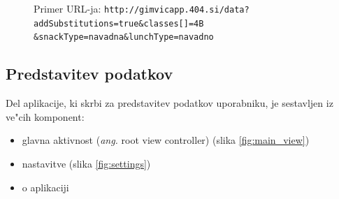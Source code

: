 \begin{figure}[!h]
	\centering
	Primer URL-ja:
	\texttt{http://gimvicapp.404.si/data?addSubstitutions=true\&classes[]=4B\\\&snackType=navadna\&lunchType=navadno}
\end{figure}

\subsection{Predstavitev podatkov}
Del aplikacije, ki skrbi za predstavitev podatkov uporabniku, je sestavljen iz ve"cih komponent:
\begin{itemize}
	\setlength\itemsep{0em}
	\item glavna aktivnost (\textit{ang.} root view controller) (slika \ref{fig:main_view})
	\item nastavitve (slika \ref{fig:settings})
	\item o aplikaciji
\end{itemize}

